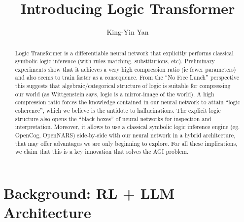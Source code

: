 \documentclass[runningheads]{llncs}
\begin{document}
%
\title{Introducing Logic Transformer}
%
%
\author{King-Yin Yan }
%
%
%
\maketitle              %
%
\begin{abstract}
Logic Transformer is a differentiable neural network that explicitly performs classical symbolic logic inference (with rules matching, substitutions, etc).  Preliminary experiments show that it achieves a very high compression ratio (ie fewer parameters) and also seems to train faster as a consequence.  From the ``No Free Lunch'' perspective this suggests that algebraic/categorical structure of logic is suitable for compressing our world (as Wittgenstein says, logic is a mirror-image of the world).  A high compression ratio forces the knowledge contained in our neural network to attain ``logic coherence'', which we believe is the antidote to hallucinations.  The explicit logic structure also opens the ``black boxes'' of neural networks for inspection and interpretation.  Moreover, it allows to use a classical symbolic logic inference engine (eg. OpenCog, OpenNARS) side-by-side with our neural network in a hybrid architecture, that may offer advantages we are only beginning to explore.  For all these implications, we claim that this is a key innovation that solves the AGI problem.

\end{abstract}


\section{Background: RL + LLM Architecture}
\end{document}
